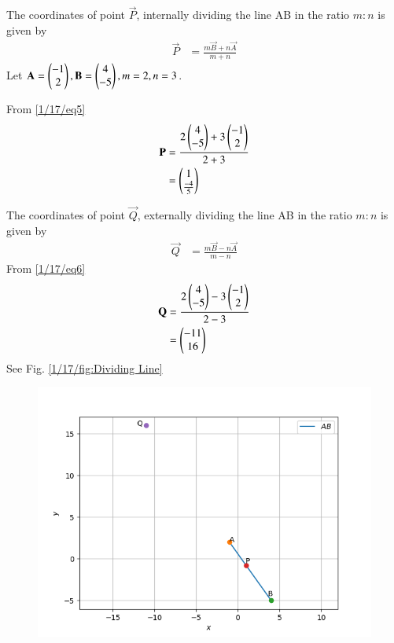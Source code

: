 The coordinates of point $\vec{P}$, internally dividing the line AB in the ratio $m:n$ is given by
\begin{align}
\vec{P} &=\frac{m \vec{B} + n \vec{A}}{m + n}
\label{1/17/eq5}
\end{align}
Let $\mathbf{A}=\begin{pmatrix}-1\\2\end{pmatrix}, \mathbf{B}=\begin{pmatrix}4\\-5\end{pmatrix}, {m}=2, {n}=3$.

From \eqref{1/17/eq5}
\begin{align}
\mathbf{P}&=\frac{2\begin{pmatrix}4\\-5\end{pmatrix}+3\begin{pmatrix}-1\\2\end{pmatrix}}{2 + 3}\\
&=\begin{pmatrix}1\\\frac{-4}{5}\end{pmatrix} 
\end{align}

The coordinates of point $\vec{Q}$, externally dividing the line AB in the ratio $m:n$ is given by\\
\begin{align}
\vec{Q}&=\frac{m \vec{B} - n \vec{A}}{m - n}
\label{1/17/eq6}
\end{align}
From \eqref{1/17/eq6}
\begin{align}
\mathbf{Q}&=\frac{2\begin{pmatrix}4\\-5\end{pmatrix}-3\begin{pmatrix}-1\\2\end{pmatrix}}{2 - 3}\\
&=\begin{pmatrix}-11\\16 \end{pmatrix}
\end{align}
See Fig. 
\eqref{1/17/fig:Dividing Line}
\begin{figure}[!ht]
	\centering 
\includegraphics[width=\columnwidth]{solutions/1/17/assignment-4.png}
\caption{}
\label{1/17/fig:Dividing Line}
\end{figure}
